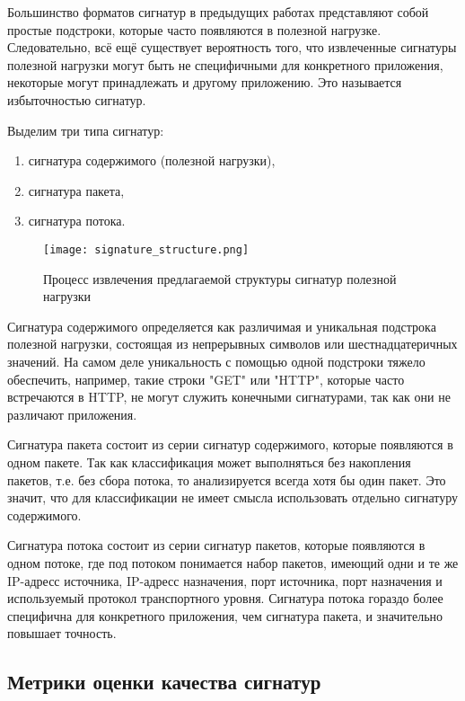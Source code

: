 Большинство форматов сигнатур в предыдущих работах представляют собой простые подстроки, которые часто появляются в полезной нагрузке.
Следовательно, всё ещё существует вероятность того, что извлеченные сигнатуры полезной нагрузки могут быть не специфичными для конкретного приложения,
некоторые могут принадлежать и другому приложению. Это называется избыточностью сигнатур.

Выделим три типа сигнатур:

\begin{enumerate}
    \item сигнатура содержимого (полезной нагрузки),
    \item сигнатура пакета,
    \item сигнатура потока.
\end{enumerate}

\begin{figure}[H]
    \begin{center}
        \texttt{[image: signature\_structure.png]}
        \caption{Процесс извлечения предлагаемой структуры сигнатур полезной нагрузки}
    \end{center}
\end{figure}

Сигнатура содержимого определяется как различимая и уникальная подстрока полезной нагрузки, состоящая из непрерывных символов или шестнадцатеричных значений.
На самом деле уникальность с помощью одной подстроки тяжело обеспечить, например, такие строки "GET" или "HTTP", которые часто встречаются в HTTP,
не могут служить конечными сигнатурами, так как они не различают приложения.

Сигнатура пакета состоит из серии сигнатур содержимого, которые появляются в одном пакете.
Так как классификация может выполняться без накопления пакетов, т.е. без сбора потока, то анализируется всегда хотя бы один пакет.
Это значит, что для классификации не имеет смысла использовать отдельно сигнатуру содержимого.

Сигнатура потока состоит из серии сигнатур пакетов, которые появляются в одном потоке, где под потоком понимается набор пакетов, имеющий одни и те же
IP-адресс источника, IP-адресс назначения, порт источника, порт назначения и используемый протокол транспортного уровня.
Сигнатура потока гораздо более специфична для конкретного приложения, чем сигнатура пакета, и значительно повышает точность.

\subsection{Метрики оценки качества сигнатур}

